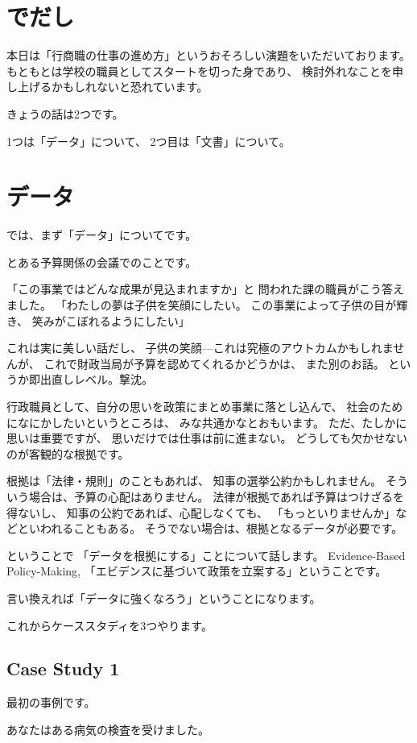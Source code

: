 \documentclass[uplatex,jis2004,dvipdfmx,12pt]{jsarticle}
\begin{document}
\section{でだし}
本日は「行商職の仕事の進め方」というおそろしい演題をいただいております。
もともとは学校の職員としてスタートを切った身であり、
検討外れなことを申し上げるかもしれないと恐れています。

きょうの話は2つです。

1つは「データ」について、
2つ目は「文書」について。


\section{データ}
では、まず「データ」についてです。

とある予算関係の会議でのことです。

「この事業ではどんな成果が見込まれますか」と
問われた課の職員がこう答えました。
「わたしの夢は子供を笑顔にしたい。
この事業によって子供の目が輝き、
笑みがこぼれるようにしたい」

これは実に美しい話だし、
子供の笑顔---これは究極のアウトカムかもしれませんが、
これで財政当局が予算を認めてくれるかどうかは、
また別のお話。
というか即出直しレベル。撃沈。

行政職員として、自分の思いを政策にまとめ事業に落とし込んで、
社会のためになにかしたいというところは、
みな共通かなとおもいます。
ただ、たしかに思いは重要ですが、
思いだけでは仕事は前に進まない。
どうしても欠かせないのが客観的な根拠です。

根拠は「法律・規則」のこともあれば、
知事の選挙公約かもしれません。
そういう場合は、予算の心配はありません。
法律が根拠であれば予算はつけざるを得ないし、
知事の公約であれば、心配しなくても、
「もっといりませんか」などといわれることもある。
そうでない場合は、根拠となるデータが必要です。

ということで
「データを根拠にする」ことについて話します。
Evidence-Based Policy-Making,
「エビデンスに基づいて政策を立案する」ということです。

言い換えれば「データに強くなろう」ということになります。

これからケーススタディを3つやります。

\subsection{Case Study 1}
最初の事例です。

あなたはある病気の検査を受けました。
\end{document}
